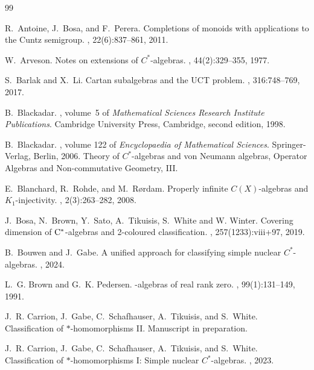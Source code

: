 \documentclass[reqno]{amsart}
\theoremstyle{definition}
\theoremstyle{remark}
\numberwithin{equation}{section}
\theoremstyle{definition}
\begin{document}
\begin{thebibliography}{99}

R.~Antoine, J.~Bosa, and F.~Perera.
\newblock Completions of monoids with applications to the {C}untz semigroup.
, 22(6):837--861, 2011.

W.~Arveson.
\newblock Notes on extensions of {$C^{*}$}-algebras.
, 44(2):329--355, 1977.

S.~Barlak and X.~Li.
\newblock Cartan subalgebras and the {UCT} problem.
, 316:748--769, 2017.

B.~Blackadar.
, volume~5 of {\em
  Mathematical Sciences Research Institute Publications}.
\newblock Cambridge University Press, Cambridge, second edition, 1998.

B.~Blackadar.
, volume 122 of {\em Encyclopaedia of
  Mathematical Sciences}.
\newblock Springer-Verlag, Berlin, 2006.
\newblock Theory of $C^*$-algebras and von Neumann algebras, Operator Algebras
  and Non-commutative Geometry, III.

E.~Blanchard, R.~Rohde, and M.~R{\o}rdam.
\newblock Properly infinite {$C(X)$}-algebras and {$K_1$}-injectivity.
, 2(3):263--282, 2008. 

J.~Bosa, N.~Brown, Y.~Sato, A.~Tikuisis, S.~White and W. Winter. 
\newblock Covering dimension of {$\rm C^*$}-algebras and 2-coloured classification. 
, 257(1233):viii+97, 2019. 

B.~Bouwen and J.~Gabe.
\newblock A unified approach for classifying simple nuclear {$C^*$}-algebras.
, 2024.

L.~G. Brown and G.~K. Pedersen.
-algebras of real rank zero.
, 99(1):131--149, 1991.

J.~R. Carrion, J.~Gabe, C.~Schafhauser, A.~Tikuisis, and S.~White.
\newblock Classification of {$\ast$}-homomorphisms {II}.
\newblock Manuscript in preparation.

J.~R. Carrion, J.~Gabe, C.~Schafhauser, A.~Tikuisis, and S.~White.
\newblock Classification of {$\ast$}-homomorphisms {I}: Simple nuclear
  {$C^*$}-algebras.
, 2023.


\end{thebibliography}
\end{document}

